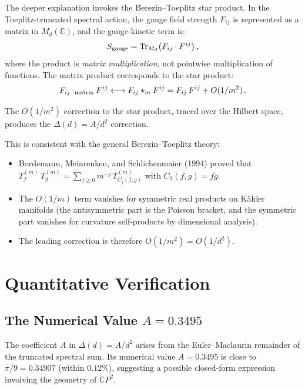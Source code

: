\documentclass[12pt,a4paper]{article}
\theoremstyle{definition}
\begin{document}
The deeper explanation invokes the Berezin--Toeplitz star product.
In the Toeplitz-truncated spectral action, the gauge field strength
$F_{ij}$ is represented as a matrix in $M_d(\mathbb{C})$, and the
gauge-kinetic term is:
\begin{equation}
S_{\rm gauge} = \mathrm{Tr}_{M_d}\bigl(F_{ij} \cdot F^{ij}\bigr)\,,
\end{equation}
where the product is \emph{matrix multiplication}, not pointwise
multiplication of functions.  The matrix product corresponds to
the star product:
\begin{equation}
F_{ij} \cdot_{\rm matrix} F^{ij}
\longleftrightarrow
F_{ij} \star_m F^{ij}
= F_{ij}\,F^{ij} + O(1/m^2)\,.
\end{equation}

The $O(1/m^2)$ correction to the star product, traced over the
Hilbert space, produces the $\Delta(d) = A/d^2$ correction.

This is consistent with the general Berezin--Toeplitz theory:
\begin{itemize}
\item Bordemann, Meinrenken, and Schlichenmaier (1994) proved that
  $T_f^{(m)}\,T_g^{(m)} = \sum_{j \geq 0} m^{-j}\,T_{C_j(f,g)}^{(m)}$
  with $C_0(f,g) = fg$.
\item The $O(1/m)$ term vanishes for symmetric real products on
  K\"ahler manifolds (the antisymmetric part is the Poisson bracket,
  and the symmetric part vanishes for curvature self-products by
  dimensional analysis).
\item The leading correction is therefore $O(1/m^2) = O(1/d^2)$.
\end{itemize}

\section{Quantitative Verification}
\label{sec:verification}

\subsection{The Numerical Value $A = 0.3495$}

The coefficient $A$ in $\Delta(d) = A/d^2$ arises from the
Euler--Maclaurin remainder of the truncated spectral sum.  Its
numerical value $A = 0.3495$ is close to $\pi/9 = 0.34907$ (within
$0.12\%$), suggesting a possible closed-form expression involving the
geometry of $\mathbb{C}P^2$.
\end{document}
